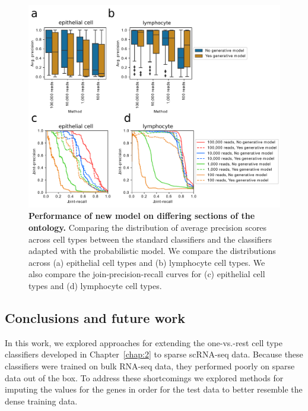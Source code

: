  \begin{figure}[htbp]
\centering
\includegraphics[width=13cm]{figures/paired_avg_precision_two_cell_types}  
\caption{\textbf{Performance of new model on differing sections of the ontology.} Comparing the distribution of average precision scores across cell types between the standard classifiers and the classifiers adapted with the probabilistic model. We compare the distributions across (a) epithelial cell types and (b) lymphocyte cell types. We also compare the join-precision-recall curves for (c) epithelial cell types and (d) lymphocyte cell types.}
\label{fig:diff_cell_types}
\end{figure}
 
      
\subsection{Conclusions and future work}

In this work, we explored approaches for extending the one-vs.-rest cell type classifiers developed in Chapter~\ref{chap:2} to sparse scRNA-seq data. Because these classifiers were trained on bulk RNA-seq data, they performed poorly on sparse data out of the box.  To address these shortcomings we explored methods for imputing the values for the genes in order for the test data to better resemble the dense training data.

